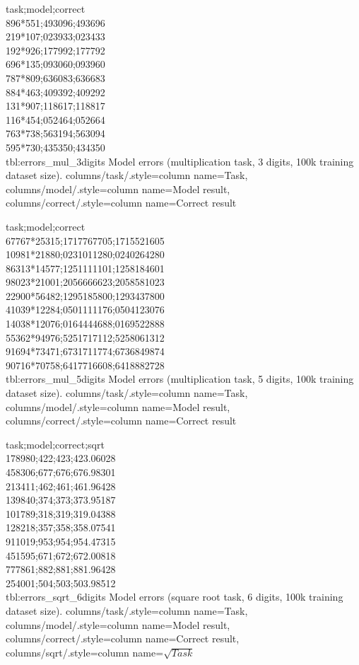 {
	task;model;correct\\
	896*551;493096;493696\\
	219*107;023933;023433\\
	192*926;177992;177792\\
	696*135;093060;093960\\
	787*809;636083;636683\\
	884*463;409392;409292\\
	131*907;118617;118817\\
	116*454;052464;052664\\
	763*738;563194;563094\\
	595*730;435350;434350\\
}
{tbl:errors_mul_3digits}
{
	Model errors (multiplication task, 3 digits, 100k training dataset size).
}
{
	columns/task/.style={column name={Task}},
	columns/model/.style={column name={Model result}},
	columns/correct/.style={column name={Correct result}}
}

{
	task;model;correct\\
	67767*25315;1717767705;1715521605\\
	10981*21880;0231011280;0240264280\\
	86313*14577;1251111101;1258184601\\
	98023*21001;2056666623;2058581023\\
	22900*56482;1295185800;1293437800\\
	41039*12284;0501111176;0504123076\\
	14038*12076;0164444688;0169522888\\
	55362*94976;5251717112;5258061312\\
	91694*73471;6731711774;6736849874\\
	90716*70758;6417716608;6418882728\\
}
{tbl:errors_mul_5digits}
{
	Model errors (multiplication task, 5 digits, 100k training dataset size).
}
{
	columns/task/.style={column name={Task}},
	columns/model/.style={column name={Model result}},
	columns/correct/.style={column name={Correct result}}
}


{
	task;model;correct;sqrt\\
	178980;422;423;423.06028\\
	458306;677;676;676.98301\\
	213411;462;461;461.96428\\
	139840;374;373;373.95187\\
	101789;318;319;319.04388\\
	128218;357;358;358.07541\\
	911019;953;954;954.47315\\
	451595;671;672;672.00818\\
	777861;882;881;881.96428\\
	254001;504;503;503.98512\\
}
{tbl:errors_sqrt_6digits}
{
	Model errors (square root task, 6 digits, 100k training dataset size).
}
{
	columns/task/.style={column name={Task}},
	columns/model/.style={column name={Model result}},
	columns/correct/.style={column name={Correct result}},
	columns/sqrt/.style={column name={$\sqrt{Task}$}}
}

